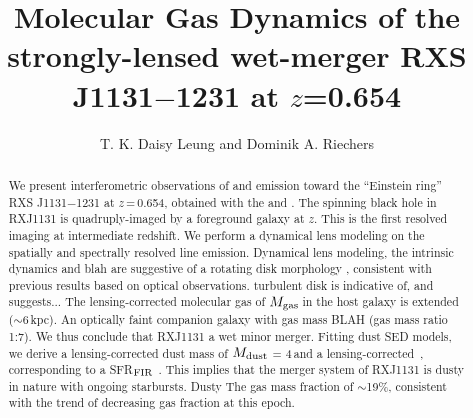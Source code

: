 \documentclass[]{emulateapj}
\begin{document}

\title{Molecular Gas Dynamics of the strongly-lensed wet-merger RXS J1131$-$1231 at $z$=0.654}
\author{T. K. Daisy Leung and Dominik A. Riechers}


\begin{abstract}
We present interferometric observations of \bco and \cco emission toward the ``Einstein ring''
RXS J1131$-$1231 at $z$\,=\,0.654, obtained with the \pdbi and \carma. 
The spinning black hole in RXJ1131 is quadruply-imaged by a foreground galaxy at $z$.
This is the first resolved \bco imaging at intermediate redshift.
We perform a dynamical lens modeling on the spatially and spectrally resolved \bco line emission.
Dynamical lens modeling, the intrinsic dynamics and blah are suggestive of a rotating disk morphology , consistent with previous results based on optical observations.
turbulent disk
is indicative of, and suggests...
The lensing-corrected molecular gas of $M_{\rm gas}$\,\Msun in the host galaxy 
is extended ($\sim$6\,kpc). An optically faint companion galaxy with gas mass BLAH (gas mass ratio 1:7). 
We thus conclude that RXJ1131 a wet minor merger.
Fitting dust SED models, we derive a lensing-corrected dust mass of $M_{\rm dust}$ = 4\,\Msun and a lensing-corrected \LIR{}\,\Lsun, corresponding to a SFR$_{\rm FIR}$ \sfrU . 
This implies that the merger system of RXJ1131 is dusty in nature with ongoing starbursts. 
Dusty
The gas mass fraction of $\sim$19\%, consistent with the trend of decreasing gas fraction at this epoch.
\end{abstract}


\end{document}
